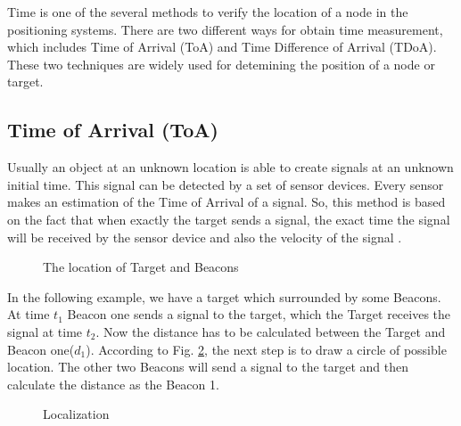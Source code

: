 Time is one of the several methods to verify the location of a node in the positioning systems. There are two different ways for obtain time measurement, which includes Time of Arrival (ToA) and Time Difference of Arrival (TDoA). These two techniques are widely used for detemining the position of a node or target.

\subsection{Time of Arrival (ToA)}

Usually an object at an unknown location is able to create signals at an unknown initial time. This signal can be detected by a set of sensor devices. Every sensor makes an estimation of the Time of Arrival of a signal. So, this method is based on the fact that when exactly the target sends a signal, the exact time the signal will be received by the sensor device and also the velocity of the signal \cite{brian17}.

\begin{figure}[htp]
    \centering
    \caption{The location of Target and Beacons \cite{brian17}}
    \label{fig:Target location}
\end{figure}

In the following example, we have a target which surrounded by some Beacons. At time $t_1$ Beacon one sends a signal to the target, which the Target receives the signal at time $t_2$. Now the distance has to be calculated between the Target and Beacon one($d_1$). According to Fig. \ref{fig:Localization}, the next step is to draw a circle of possible location. The other two Beacons will send a signal to the target and then calculate the distance as the Beacon 1.

\begin{figure}[htp]
    \centering
    \caption{Localization \cite{jin18}}
    \label{fig:Localization}
\end{figure}

